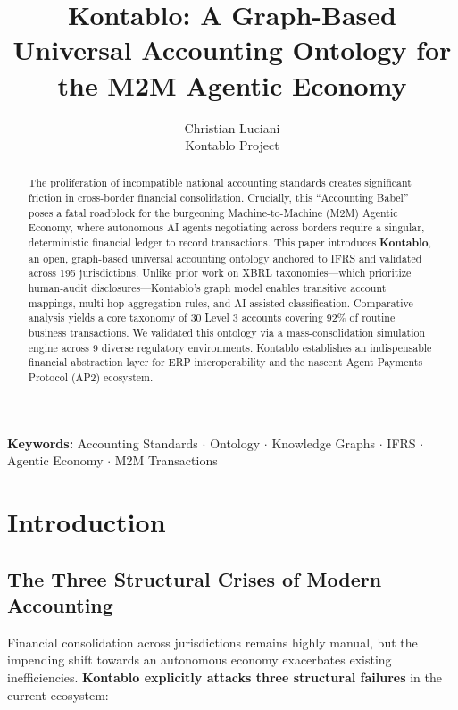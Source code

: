 \documentclass[12pt]{article}
\title{Kontablo: A Graph-Based Universal Accounting Ontology for the M2M Agentic Economy}
\author{Christian Luciani \\ Kontablo Project}
\date{}
\begin{document}
\maketitle

\begin{abstract}
The proliferation of incompatible national accounting standards creates significant friction in cross-border financial consolidation. Crucially, this ``Accounting Babel'' poses a fatal roadblock for the burgeoning Machine-to-Machine (M2M) Agentic Economy, where autonomous AI agents negotiating across borders require a singular, deterministic financial ledger to record transactions. This paper introduces \textbf{Kontablo}, an open, graph-based universal accounting ontology anchored to IFRS and validated across 195 jurisdictions. Unlike prior work on XBRL taxonomies—which prioritize human-audit disclosures—Kontablo's graph model enables transitive account mappings, multi-hop aggregation rules, and AI-assisted classification. Comparative analysis yields a core taxonomy of 30 Level 3 accounts covering 92\% of routine business transactions. We validated this ontology via a mass-consolidation simulation engine across 9 diverse regulatory environments. Kontablo establishes an indispensable financial abstraction layer for ERP interoperability and the nascent Agent Payments Protocol (AP2) ecosystem.
\end{abstract}

\vspace{1em}
\noindent \textbf{Keywords:} Accounting Standards $\cdot$ Ontology $\cdot$ Knowledge Graphs $\cdot$ IFRS $\cdot$ Agentic Economy $\cdot$ M2M Transactions

\section{Introduction}

\subsection{The Three Structural Crises of Modern Accounting}
Financial consolidation across jurisdictions remains highly manual, but the impending shift towards an autonomous economy exacerbates existing inefficiencies. \textbf{Kontablo explicitly attacks three structural failures} in the current ecosystem:
\end{document}

